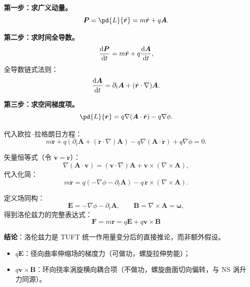 \documentclass[11pt]{ctexart}
\newcommand{\ve}[1]{\bm{#1}}                         %
\begin{document}
\textbf{第一步：求广义动量。}
\begin{equation}
\ve{P}=\pd{L}{\dot{\ve{r}}}=m\dot{\ve{r}}+q\ve{A}.
\label{eq:momentum}
\end{equation}

\textbf{第二步：求时间全导数。}
\begin{equation}
\dv{\ve{P}}{t}=m\ddot{\ve{r}}+q\dv{\ve{A}}{t},
\label{eq:dPdt}
\end{equation}
全导数链式法则：
\begin{equation}
\dv{\ve{A}}{t}=\partial_{t}\ve{A}+(\dot{\ve{r}}\cdot\nabla)\ve{A}.
\label{eq:chain}
\end{equation}

\textbf{第三步：求空间梯度项。}
\begin{equation}
\pd{L}{\ve{r}}=q\nabla(\ve{A}\cdot\dot{\ve{r}})-q\nabla\phi.
\label{eq:dLdr}
\end{equation}

代入欧拉--拉格朗日方程：
\begin{equation}
m\ddot{\ve{r}}+q\left(\partial_{t}\ve{A}+(\dot{\ve{r}}\cdot\nabla)\ve{A}\right)
-q\nabla(\ve{A}\cdot\dot{\ve{r}})+q\nabla\phi=0.
\label{eq:ELexpand}
\end{equation}

矢量恒等式（令 $\ve{v}=\dot{\ve{r}}$）：
\begin{equation}
\nabla(\ve{A}\cdot\ve{v})=(\ve{v}\cdot\nabla)\ve{A}+\ve{v}\times(\nabla\times\ve{A}),
\label{eq:vectorid}
\end{equation}
代入化简：
\begin{equation}
m\ddot{\ve{r}}=q\left(-\nabla\phi-\partial_{t}\ve{A}\right)-q\,\dot{\ve{r}}\times(\nabla\times\ve{A}).
\label{eq:Lforce-step}
\end{equation}

定义场同构：
\begin{equation}
\ve{E}=-\nabla\phi-\partial_{t}\ve{A},\qquad
\ve{B}=\nabla\times\ve{A}=\ve{\omega},
\label{eq:EB}
\end{equation}
得到洛伦兹力的完整表达式：
\begin{equation}
\boxed{\;\ve{F}=m\ddot{\ve{r}}=q\ve{E}+q\ve{v}\times\ve{B}\;}
\label{eq:Lorentz}
\end{equation}

\noindent\textbf{结论}：洛伦兹力是 TUFT 统一作用量变分后的直接推论，而非额外假设。
\begin{itemize}
\item $q\ve{E}$：径向曲率伸缩场的梯度力（可做功，螺旋拉伸势能）；
\item $q\ve{v}\times\ve{B}$：环向挠率涡旋横向耦合项（不做功，螺旋曲面切向偏转，与 NS 涡升力同源）。
\end{itemize}
\end{document}
